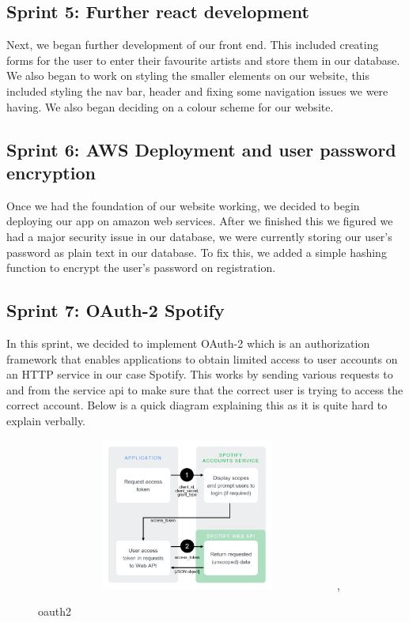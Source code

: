 \subsection{Sprint 5: Further react development}
Next, we began further development of our front end. This included creating forms for the user to enter their favourite artists and store them in our database. We also began to work on styling the smaller elements on our website, this included styling the nav bar, header and fixing some navigation issues we were having. We also began deciding on a colour scheme for our website. 

\subsection{Sprint 6: AWS Deployment and user password encryption}
Once we had the foundation of our website working, we decided to begin deploying our app on amazon web services. After we finished this we figured we had a major security issue in our database, we were currently storing our user’s password as plain text in our database. To fix this, we added a simple hashing function to encrypt the user’s password on registration.

\subsection{Sprint 7: OAuth-2 Spotify}
In this sprint, we decided to implement OAuth-2 which is an authorization framework that enables applications to obtain limited access to user accounts on an HTTP service in our case Spotify. This works by sending various requests to and from the service api to make sure that the correct user is trying to access the correct account. Below is a quick diagram explaining this as it is quite hard to explain verbally.

\begin{figure}[ht]
\renewcommand\thefigure{3.5}
\centering
\includegraphics[width=10cm, height=5cm]{img/oauth.png},
\caption{oauth2}
\label{oauth2}
\end{figure}

